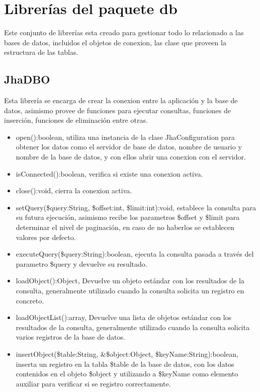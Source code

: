 \section{Librer\'ias del paquete \textsf{db}}
Este conjunto de librer\'ias esta creado para gestionar todo lo relacionado a las bases de datos, incluidos el objetos de conexion, las clase que proveen la estructura de las tablas.
\subsection{JhaDBO}
Esta librer\'ia se encarga de crear la conexion entre la aplicaci\'on y la base de datos, asimismo provee de funciones para ejecutar consultas, funciones de inserci\'on, funciones de eliminaci\'on entre otras.
\begin{itemize}
\item \textsf{open():boolean}, utiliza una instancia de la clase \textsf{JhaConfiguration} para obtener los datos como el servidor de base de datos, nombre de usuario y nombre de la base de datos, y con ellos abrir una conexion con el servidor.
\item \textsf{isConnected():boolean}, verifica si existe una conexion activa.
\item \textsf{close():void}, cierra la conexion activa.
\item \textsf{setQuery(\$query:String, \$offset:int, \$limit:int):void}, establece la consulta para su futura ejecuci\'on, asimismo recibe los parametros \textsf{\$offset} y \textsf{\$limit} para determinar el nivel de paginaci\'on, en caso de no haberlos se establecen valores por defecto.
\item \textsf{executeQuery(\$query:String):boolean}, ejecuta la consulta pasada a trav\'es del parametro \textsf{\$query} y devuelve su resultado.
\item \textsf{loadObject():Object}, Devuelve un objeto est\'andar con los resultados de la consulta, generalmente utilizado cuando la consulta solicita un registro en concreto.
\item \textsf{loadObjectList():array}, Devuelve una lista de objetos est\'andar con los resultados de la consulta, generalmente utilizado cuando la consulta solicita varios registros de la base de datos.
\item \textsf{insertObject(\$table:String, \&\$object:Object, \$keyName:String):boolean}, inserta un registro en la tabla \textsf{\$table} de la base de datos, con los datos contenidos en el objeto \textsf{\$object} y utilizando a \textsf{\$keyName} como elemento auxiliar para verificar si se registro correctamente.

\end{itemize}
